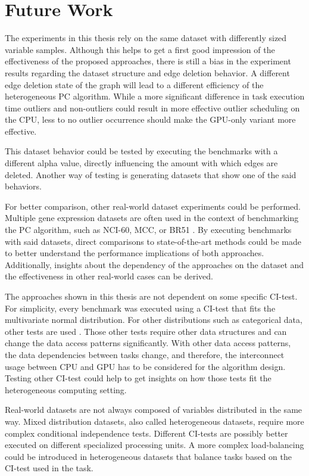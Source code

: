 \chapter{Future Work}
\label{chap:fuwork}
The experiments in this thesis rely on the same dataset with differently sized variable samples. Although this helps to get a first good impression of the effectiveness of the proposed approaches, there is still a bias in the experiment results regarding the dataset structure and edge deletion behavior. A different edge deletion state of the graph will lead to a different efficiency of the heterogeneous PC algorithm. While a more significant difference in task execution time outliers and non-outliers could result in more effective outlier scheduling on the CPU, less to no outlier occurrence should make the GPU-only variant more effective.

This dataset behavior could be tested by executing the benchmarks with a different alpha value, directly influencing the amount with which edges are deleted. Another way of testing is generating datasets that show one of the said behaviors.

For better comparison, other real-world dataset experiments could be performed. Multiple gene expression datasets are often used in the context of benchmarking the PC algorithm, such as NCI-60, MCC, or BR51 \cite{leFastPCAlgorithm2019}. By executing benchmarks with said datasets, direct comparisons to state-of-the-art methods could be made to better understand the performance implications of both approaches. Additionally, insights about the dependency of the approaches on the dataset and the effectiveness in other real-world cases can be derived.

The approaches shown in this thesis are not dependent on some specific CI-test. For simplicity, every benchmark was executed using a CI-test that fits the multivariate normal distribution. For other distributions such as categorical data, other tests are used \cite{scutariLearningBayesianNetworks2010}. Those other tests require other data structures and can change the data access patterns significantly. With other data access patterns, the data dependencies between tasks change, and therefore, the interconnect usage between CPU and GPU has to be considered for the algorithm design. Testing other CI-test could help to get insights on how those tests fit the heterogeneous computing setting.

Real-world datasets are not always composed of variables distributed in the same way. Mixed distribution datasets, also called heterogeneous datasets, require more complex conditional independence tests. Different CI-tests are possibly better executed on different specialized processing units. A more complex load-balancing could be introduced in heterogeneous datasets that balance tasks based on the CI-test used in the task.

